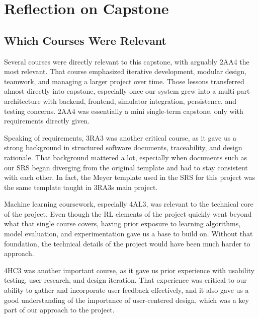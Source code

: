 \documentclass{article}
\begin{document}
\section{Reflection on Capstone}


\subsection{Which Courses Were Relevant}


Several courses were directly relevant to this capstone, with arguably 2AA4 the most relevant.
That course emphasized iterative development, modular design, teamwork, and managing a larger project over time.
Those lessons transferred almost directly into capstone, especially once our system grew into a multi-part
architecture with backend, frontend, simulator integration, persistence, and testing concerns.
2AA4 was essentially a mini single-term capstone, only with requirements directly given.

Speaking of requirements, 3RA3 was another critical course, as it gave us a strong background in structured
software documents, traceability, and design rationale.
That background mattered a lot, especially when documents such as our SRS began diverging from the original
template and had to stay consistent with each other.
In fact, the Meyer template used in the SRS for this project was the same template taught in 3RA3s
main project.

Machine learning coursework, especially 4AL3, was relevant to the technical core of the project.
Even though the RL elements of the project quickly went beyond what that single course covers, having prior
exposure to learning algorithms, model evaluation, and experimentation gave us a base to build on.
Without that foundation, the technical details of the project would have been much harder to approach.

4HC3 was another important course, as it gave us prior experience with usability testing, user research,
and design iteration.
That experience was critical to our ability to gather and incorporate user feedback effectively,
and it also gave us a good understanding of the importance of user-centered design, which was a
key part of our approach to the project.
\end{document}
